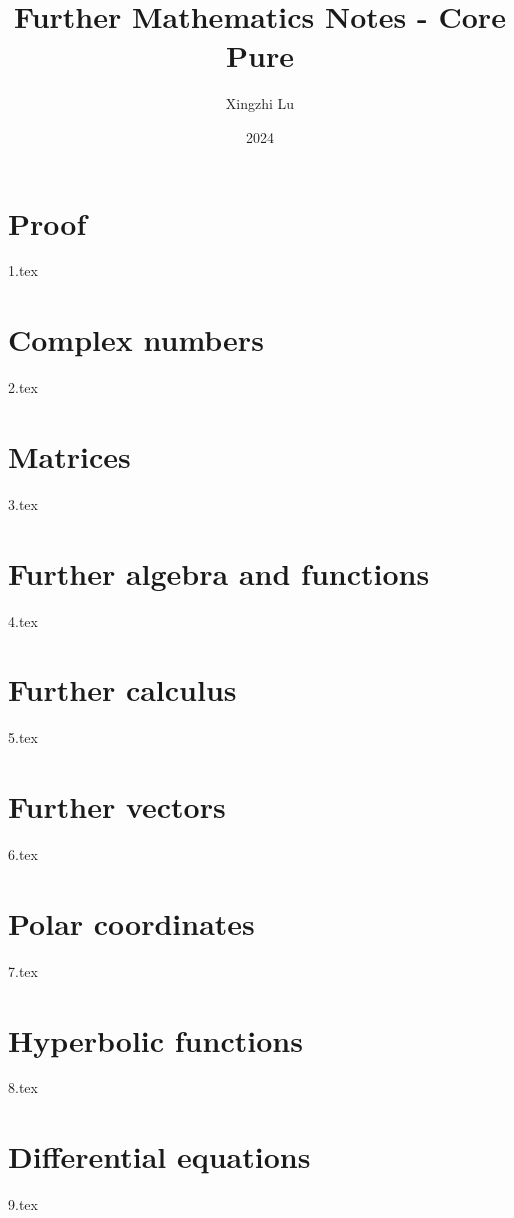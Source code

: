 \documentclass[A4paper]{article}
\title{Further Mathematics Notes - Core Pure}
\author{Xingzhi Lu}
\date{2024}
\begin{document}
	\maketitle
	\tableofcontents
	\pagebreak
	\section{Proof} %
	{1.tex} \pagebreak
	
	\section{Complex numbers}
	{2.tex} \pagebreak
	
	\section{Matrices}
	{3.tex} \pagebreak
	
	\section{Further algebra and functions}
	{4.tex} \pagebreak
	
	\section{Further calculus}
	{5.tex} \pagebreak
	
	\section{Further vectors} %
	{6.tex} \pagebreak
	
	\section{Polar coordinates}
	{7.tex} \pagebreak
	
	\section{Hyperbolic functions}
	{8.tex} \pagebreak
	
	\section{Differential equations}
	{9.tex}

	
	
	\pagebreak
	
	
\end{document}
